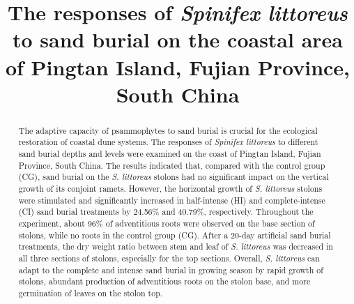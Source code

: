 \documentclass[]{interact}
\theoremstyle{plain}%
\theoremstyle{definition}
\theoremstyle{remark}
\begin{document}

\title{The responses of \textit{\textit{Spinifex littoreus}} to sand burial on the coastal area of Pingtan Island, Fujian Province, South China}

\author{
}

\maketitle

\begin{abstract}
\label{abstract}
The adaptive capacity of psammophytes to sand burial is crucial for the ecological restoration of coastal dune systems. 
The responses of \textit{Spinifex littoreus} to different sand burial depths and levels were examined on the coast of Pingtan Island, Fujian Province, South China. 
The results indicated that, compared with the control group (CG), sand burial on the \textit{S. littoreus} stolons had no significant impact on the vertical growth of its conjoint ramets. 
However, the horizontal growth of \textit{S. littoreus} stolons were stimulated and significantly increased in half-intense (HI) and complete-intense (CI) sand burial treatments by 24.56\% and 40.79\%, respectively. 
Throughout the experiment, about 96\% of adventitious roots were observed on the base section of stolons, while no roots in the control group (CG). 
After a 20-day artificial sand burial treatments, the dry weight ratio between stem and leaf of \textit{S. littoreus} was decreased in all three sections of stolons, especially for the top sections. 
Overall, \textit{S. littoreus} can adapt to the complete and intense sand burial in growing season by rapid growth of stolons, abundant production of adventitious roots on the stolon base, and more germination of leaves on the stolon top.
\end{abstract}
\end{document}
